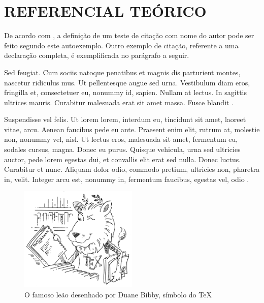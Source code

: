 
\chapter{REFERENCIAL TEÓRICO}\label{referencial}


De acordo com , a definição de um teste de citação com nome do autor pode ser feito segundo este autoexemplo. Outro exemplo de citação, referente a uma declaração completa, é exemplificada no parágrafo a seguir.

Sed feugiat. Cum sociis natoque penatibus et magnis dis parturient montes, nascetur ridiculus mus. Ut pellentesque augue sed urna. Vestibulum diam eros, fringilla et, consectetuer eu, nonummy id, sapien. Nullam at lectus. In sagittis ultrices mauris. Curabitur malesuada erat sit amet massa. Fusce blandit \cite{AtkinsJones2012,AtkinsPaula2014}.


\lipsum[5]


Suspendisse vel felis. Ut lorem lorem, interdum eu, tincidunt sit amet, laoreet vitae, arcu. Aenean faucibus pede eu ante. Praesent enim elit, rutrum at, molestie non, nonummy vel, nisl. Ut lectus eros, malesuada sit amet, fermentum eu, sodales cursus, magna. Donec eu purus. Quisque vehicula, urna sed ultricies auctor, pede lorem egestas dui, et convallis elit erat sed nulla. Donec luctus. Curabitur et nunc. Aliquam dolor odio, commodo pretium, ultricies non, pharetra in, velit. Integer arcu est, nonummy in, fermentum faucibus, egestas vel, odio \cite{AzevedoFernandes2015,BairdCann2011,BaptistaEA2014,BergmanEA2015}.



\begin{figure}[H]
\centering
\caption{O famoso leão desenhado por Duane Bibby, símbolo do \TeX}\label{fig1}
\includegraphics[width=0.5\textwidth]{./dados/figuras/tex_lion.png}
\end{figure}


